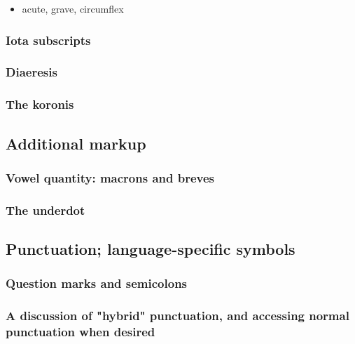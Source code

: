 \documentclass[11pt]{article}
\begin{document}
\begin{itemize}
\item acute, grave, circumflex
\end{itemize}

\subsubsection{Iota subscripts}
\label{sec:org65a09c0}

\subsubsection{Diaeresis}
\label{sec:org2e73c70}

\subsubsection{The koronis}
\label{sec:orgd26fe43}

\subsection{Additional markup}
\label{sec:org28b1a3c}

\subsubsection{Vowel quantity: macrons and breves}
\label{sec:org8bc06a4}

\subsubsection{The underdot}
\label{sec:org9e1bd8b}

\subsection{Punctuation; language-specific symbols}
\label{sec:orgf06dce9}

\subsubsection{Question marks and semicolons}
\label{sec:org616e70d}

\subsubsection{A discussion of "hybrid" punctuation, and accessing normal punctuation when desired}
\label{sec:org88e2f5b}
\end{document}
